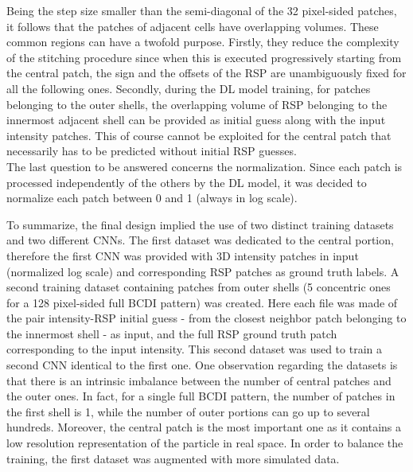 Being the step size smaller than the 
semi-diagonal of the 32 pixel-sided patches, it follows that the patches of adjacent cells have overlapping volumes. 
These common regions can have a twofold purpose. Firstly, they reduce the complexity of the stitching procedure since 
when this is executed progressively starting from the central patch, the sign and the offsets of the RSP are unambiguously 
fixed for all the following ones. Secondly, during the DL model training, for patches belonging to the outer shells, 
the overlapping volume of RSP belonging to the innermost adjacent shell can be provided as initial guess along with the input 
intensity patches. This of course cannot be exploited for the central patch that necessarily has to be predicted without 
initial RSP guesses. \\
The last question to be answered concerns the normalization. Since each patch is processed independently of the others 
by the DL model, it was decided to normalize each patch between 0 and 1 (always in log scale). 

To summarize, the final design implied the use of two distinct training datasets and two different CNNs. 
The first dataset was dedicated to the central portion, therefore the first CNN was provided with 3D intensity patches in 
input (normalized log scale) and corresponding RSP patches as ground truth labels. A second training dataset containing 
patches from outer shells (5 concentric ones for a 128 pixel-sided full BCDI pattern) was created. Here each file was made 
of the pair intensity-RSP initial guess - from the closest neighbor patch belonging to the innermost shell -  as input,
and the full RSP ground truth patch corresponding to the input intensity. This second dataset was used to train a second 
CNN identical to the first one. One observation regarding the datasets is that there is an intrinsic imbalance between the 
number of central patches and the outer ones. In fact, for a single full BCDI pattern, the number of patches in the first shell is 1, 
while the number of outer portions can go up to several hundreds. Moreover, the central patch is the most important one as it 
contains a low resolution representation of the particle in real space. In order to balance the training, the first dataset was 
augmented with more simulated data. 

